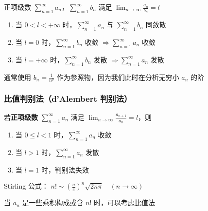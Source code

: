 \documentclass[lang = zh , final , oneside , openany , titlepage , zihao = -4 , linespread = 1.3 , baselineskip = false , cjk-font = windows , text-font = newtx , math-font = newtx , math-style = ISO , uppercase-greek = upright , integral-limits = false]{sjtureport}
\begin{document}
\begin{theorem}
    正项级数
\(\displaystyle \sum_{n=1}^\infty a_n\)，\(\displaystyle \sum_{n=1}^\infty b_n\)
满足 \(\displaystyle \lim_{n\to\infty} \frac{a_n}{b_n} = l\)

\begin{enumerate}
\item
  当 \(0 <l<+\infty\) 时，\(\displaystyle \sum_{n=1}^\infty a_n\) 与
  \(\displaystyle \sum_{n=1}^\infty b_n\) 同敛散
\item
  当 \(l=0\) 时，\(\displaystyle \sum_{n=1}^\infty b_n\) 收敛
  \(\Rightarrow \displaystyle \sum_{n=1}^\infty a_n\) 收敛
\item
  当 \(l=+\infty\) 时，\(\displaystyle \sum_{n=1}^\infty b_n\) 发散
  \(\Rightarrow \displaystyle \sum_{n=1}^\infty a_n\) 发散
\end{enumerate}
\end{theorem}

\begin{remark}
    通常使用 \(b_n = \frac{1}{n^p}\) 作为参照物，因为我们此时在分析无穷小
\(a_n\) 的阶
\end{remark}

\subsubsection{比值判别法（d'Alembert 判别法）}

\begin{theorem}
    若\textbf{正项级数} \(\displaystyle \sum_{n=1}^\infty a_n\) 满足
\(\displaystyle \lim_{n\to\infty} \frac{a_{n+1}}{a_n} = l\)，则

\begin{enumerate}
\item
  当 \(0\leq l<1\) 时，\(\displaystyle \sum_{n=1}^\infty a_n\) 收敛
\item
  当 \(l>1\) 时，\(\displaystyle \sum_{n=1}^\infty a_n\) 发散
\item
  当 \(l=1\) 时，判别法失效
\end{enumerate}
\end{theorem}

\begin{remark}
    Stirling 公式：
\(n! \sim \left(\frac{n}{e}\right)^n \sqrt{2n\pi} \quad (n\to\infty)\)
\end{remark}

\begin{remark}
    当 \(a_n\) 是一些乘积构成或含 \(n!\) 时，可以考虑比值法
\end{remark}
\end{document}
